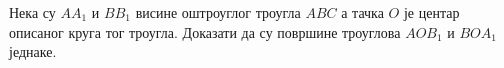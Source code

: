 \problem
Нека су $A A_1$ и $B B_1$ висине оштроуглог троугла $ABC$ а тачка $O$ је центар
описаног круга тог троугла.
Доказати да су површине троуглова $A O B_1$ и $B O A_1$ једнаке.

\solution

\endproblem
